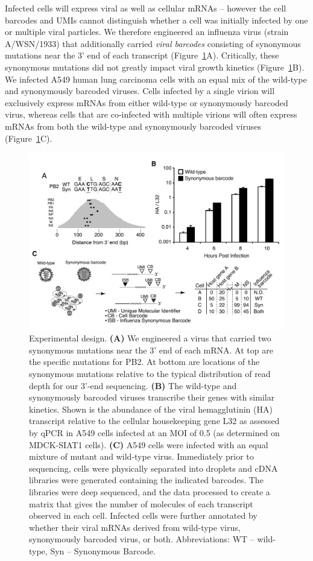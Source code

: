 \documentclass[9pt,lineno]{elife}
\begin{document}
Infected cells will express viral as well as cellular mRNAs -- however the cell barcodes and UMIs cannot distinguish whether a cell was initially infected by one or multiple viral particles.
We therefore engineered an influenza virus (strain A/WSN/1933) that additionally carried \emph{viral barcodes} consisting of synonymous mutations near the 3' end of each transcript (Figure~\ref{fig:workflow}A).
Critically, these synonymous mutations did not greatly impact viral growth kinetics (Figure~\ref{fig:workflow}B).
We infected A549 human lung carcinoma cells with an equal mix of the wild-type and synonymously barcoded viruses.
Cells infected by a single virion will exclusively express mRNAs from either wild-type or synonymously barcoded virus, whereas cells that are co-infected with multiple virions will often express mRNAs from both the wild-type and synonymously barcoded viruses (Figure~\ref{fig:workflow}C).
\begin{figure}
\centerline{\includegraphics[width=0.8\linewidth]{figures/Workflow/workflow.pdf}}
\caption{\label{fig:workflow} Experimental design.
{\bf (A)}  
We engineered a virus that carried two synonymous mutations near the 3' end of each mRNA.
At top are the specific mutations for PB2.
At bottom are locations of the synonymous mutations relative to the typical distribution of read depth for our 3'-end sequencing.
{\bf (B)} 
The wild-type and synonymously barcoded viruses transcribe their genes with similar kinetics. 
Shown is the abundance of the viral hemagglutinin (HA) transcript relative to the cellular housekeeping gene L32 as assessed by qPCR in A549 cells infected at an MOI of 0.5 (as determined on MDCK-SIAT1 cells).
{\bf (C)}  
A549 cells were infected with an equal mixture of mutant and wild-type virus. 
Immediately prior to sequencing, cells were physically separated into droplets and cDNA libraries were generated containing the indicated barcodes. 
The libraries were deep sequenced, and the data processed to create a matrix that gives the number of molecules of each transcript observed in each cell.
Infected cells were further annotated by whether their viral mRNAs derived from wild-type virus, synonymously barcoded virus, or both.
Abbreviations: WT -- wild-type, Syn -- Synonymous Barcode.
}
\end{figure}
\end{document}
